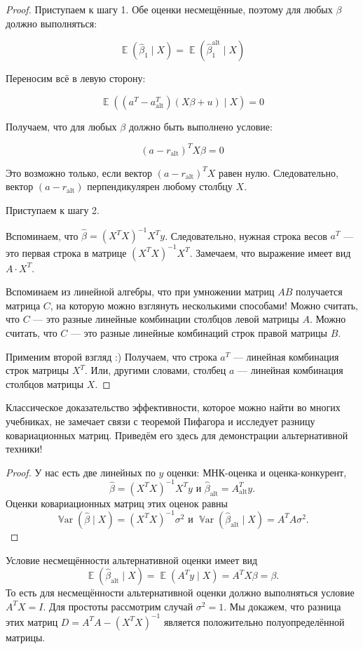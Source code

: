 \documentclass[12pt]{article}
\DeclareMathOperator{\Var}{\mathbb{V}ar}
\DeclareMathOperator{\E}{\mathbb{E}}
\newcommand{\hb}{\hat{\beta}}
\newcommand{\alt}{\text{alt}}
\begin{document}
\begin{proof}




Приступаем к шагу 1. Обе оценки несмещённые, поэтому для любых $\beta$ должно выполняться:

\[
\E(\hb_1 \mid X) = \E(\hb_1^{\alt} \mid X)
\]

Переносим всё в левую сторону:

\[
\E((a^T - a^T_{\alt})(X\beta + u) \mid X) = 0
\]

Получаем, что для любых $\beta$ должно быть выполнено условие:

\[
(a - r_{\alt})^T X\beta = 0
\]

Это возможно только, если вектор $(a - r_{\alt})^T X$ равен нулю. 
Следовательно, вектор $(a - r_{\alt})$ перпендикулярен любому столбцу $X$.


Приступаем к шагу 2.

Вспоминаем, что $\hat \beta = (X^T X)^{-1}X^T y$. Следовательно, нужная строка весов $a^T$ — 
это первая строка в матрице $(X^TX)^{-1}X^T$. 
Замечаем, что выражение имеет вид $A \cdot X^T$. 

Вспоминаем из линейной алгебры, что при умножении матриц $AB$ получается матрица $C$, 
на которую можно взглянуть несколькими способами!
Можно считать, что $C$ — это разные линейные комбинации столбцов левой матрицы $A$. 
Можно считать, что $C$ — это разные линейные комбинаций строк правой матрицы $B$.

Применим второй взгляд :) Получаем, что строка $a^T$ — линейная комбинация строк матрицы $X^T$. 
Или, другими словами, столбец $a$ — линейная комбинация столбцов матрицы $X$.
\end{proof}

Классическое доказательство эффективности, которое можно найти во многих учебниках, не замечает связи с теоремой Пифагора и исследует разницу ковариационных матриц. 
Приведём его здесь для демонстрации альтернативной техники!
\begin{proof}
У нас есть две линейных по $y$ оценки: МНК-оценка и оценка-конкурент,
\[
\hb = (X^TX)^{-1}X^T y \text{ и } \hb_{\alt} = A^T_{\alt} y.
\]
Оценки ковариационных матриц этих оценок равны 
\[
\Var(\hb \mid X) = (X^TX)^{-1} \sigma^2 \text{ и } \Var(\hb_{\alt} \mid X) = A^TA \sigma^2.
\]
\end{proof}
Условие несмещённости альтернативной оценки имеет вид 
\[
\E(\hb_{\alt} \mid X) = \E(A^T y \mid X) = A^T X\beta = \beta.
\]
То есть для несмещённости альтернативной оценки должно выполняться условие $A^T X = I$.
Для простоты рассмотрим случай $\sigma^2 = 1$.
Мы докажем, что разница этих матриц $D = A^TA - (X^TX)^{-1}$ является положительно полуопределённой матрицы. 
\end{document}
